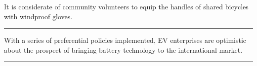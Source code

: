 \documentclass[11pt,a4paper]{article}
\newcommand{\num}[1]{\makebox[1.9em][r]{#1.}\hspace{0.3em}}
\newcommand{\wline}{\noindent\rule{\linewidth}{0.4pt}}
\begin{document}
\begin{minipage}{\linewidth}

\num{39}It is considerate of community volunteers to equip the handles of shared bicycles with windproof gloves.

\vspace{0.25em}

\wline

\end{minipage}

\begin{minipage}{\linewidth}

\num{40}With a series of preferential policies implemented, EV enterprises are optimistic about the prospect of bringing battery technology to the international market.

\vspace{0.25em}

\wline

\end{minipage}
\end{document}
